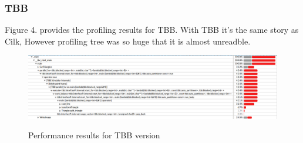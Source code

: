 \subsubsection*{TBB}
Figure 4. provides the profiling results for TBB. With TBB it's the same story as Cilk, However profiling tree was so huge that it is almost unreadble.
\begin{figure}
\includegraphics[width=1\textwidth]{./pictures/tbb.png}
\label{tbbpro}
\caption{Performance results for TBB version}
\end{figure}

